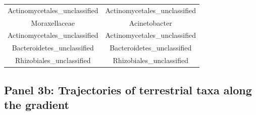 \documentclass[]{article}
\begin{document}
\begin{longtable}[]{@{}cc@{}}
\begin{minipage}[t]{0.41\columnwidth}\centering
Actinomycetales\_unclassified\strut
\end{minipage} & \begin{minipage}[t]{0.41\columnwidth}\centering
Actinomycetales\_unclassified\strut
\end{minipage}\tabularnewline
\begin{minipage}[t]{0.41\columnwidth}\centering
Moraxellaceae\strut
\end{minipage} & \begin{minipage}[t]{0.41\columnwidth}\centering
Acinetobacter\strut
\end{minipage}\tabularnewline
\begin{minipage}[t]{0.41\columnwidth}\centering
Actinomycetales\_unclassified\strut
\end{minipage} & \begin{minipage}[t]{0.41\columnwidth}\centering
Actinomycetales\_unclassified\strut
\end{minipage}\tabularnewline
\begin{minipage}[t]{0.41\columnwidth}\centering
Bacteroidetes\_unclassified\strut
\end{minipage} & \begin{minipage}[t]{0.41\columnwidth}\centering
Bacteroidetes\_unclassified\strut
\end{minipage}\tabularnewline
\begin{minipage}[t]{0.41\columnwidth}\centering
Rhizobiales\_unclassified\strut
\end{minipage} & \begin{minipage}[t]{0.41\columnwidth}\centering
Rhizobiales\_unclassified\strut
\end{minipage}\tabularnewline
\bottomrule
\end{longtable}

\hypertarget{panel-3b-trajectories-of-terrestrial-taxa-along-the-gradient}{%
\subsection{Panel 3b: Trajectories of terrestrial taxa along the
gradient}\label{panel-3b-trajectories-of-terrestrial-taxa-along-the-gradient}}
\end{document}
